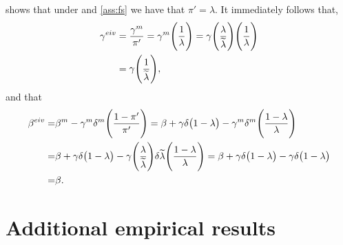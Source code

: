  shows that under  and \ref{ass:fs} we have that ${\pi}'=\lambda$. It immediately follows that,
\begin{align}
    \gamma^{eiv}&=\frac{\gamma^m}{\pi'} =\gamma^m \Bigg(\frac{1}{\lambda} \Bigg)=\gamma\Bigg(\frac{\lambda}{\widetilde{\lambda}}\Bigg)\Bigg(\frac{1}{\lambda} \Bigg) \\ \notag
    &=\gamma\Bigg(\frac{1}{\widetilde{\lambda}}\Bigg),
\end{align}
and that
\begin{align}
    \beta^{eiv}=&\beta^m-\gamma^m \delta^m\Bigg(\frac{1-\pi'}{\pi'}\Bigg)=\beta + \gamma\delta \big(1-\lambda \big) -\gamma^m \delta^m\Bigg(\frac{1-\lambda}{\lambda}\Bigg) \\ \notag
    =&\beta + \gamma\delta \big(1-\lambda \big) -\gamma\Bigg(\frac{\lambda}{\widetilde{\lambda}}\Bigg) \delta \widetilde{\lambda} \Bigg(\frac{1-\lambda}{\lambda}\Bigg)= \beta + \gamma\delta \big(1-\lambda \big) -\gamma\delta \big(1-\lambda \big) \\ \notag
    =& \beta.
\end{align}

\newpage

\section{Additional empirical results}\label{sec:additionalresults}
















